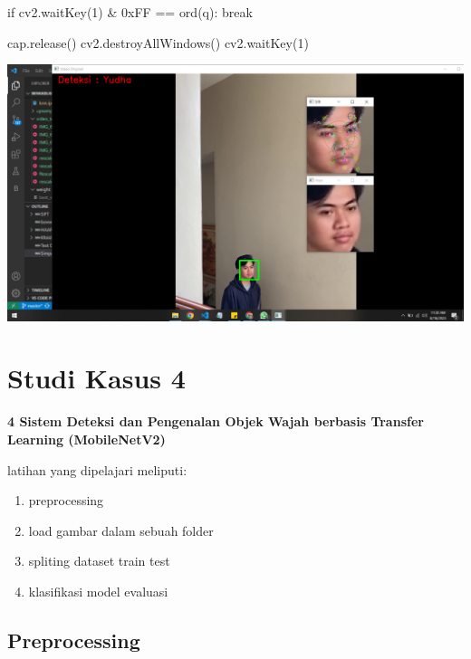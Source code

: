 \documentclass[
  letterpaper,
  DIV=11,
  numbers=noendperiod]{scrreprt}
\newenvironment{Shaded}{\begin{snugshade}}{\end{snugshade}}
\newcommand{\BaseNTok}[1]{\textcolor[rgb]{0.68,0.00,0.00}{#1}}
\newcommand{\BuiltInTok}[1]{\textcolor[rgb]{0.00,0.23,0.31}{#1}}
\newcommand{\ControlFlowTok}[1]{\textcolor[rgb]{0.00,0.23,0.31}{#1}}
\newcommand{\DecValTok}[1]{\textcolor[rgb]{0.68,0.00,0.00}{#1}}
\newcommand{\NormalTok}[1]{\textcolor[rgb]{0.00,0.23,0.31}{#1}}
\newcommand{\OperatorTok}[1]{\textcolor[rgb]{0.37,0.37,0.37}{#1}}
\newcommand{\StringTok}[1]{\textcolor[rgb]{0.13,0.47,0.30}{#1}}
\providecommand{\tightlist}{%
  \setlength{\itemsep}{0pt}\setlength{\parskip}{0pt}}\usepackage{longtable,booktabs,array}
\begin{document}
\begin{Shaded}
\begin{Highlighting}[]
    \ControlFlowTok{if}\NormalTok{ cv2.waitKey(}\DecValTok{1}\NormalTok{) }\OperatorTok{\&} \BaseNTok{0xFF} \OperatorTok{==} \BuiltInTok{ord}\NormalTok{(}\StringTok{\textquotesingle{}q\textquotesingle{}}\NormalTok{):}
        \ControlFlowTok{break}
    
\NormalTok{cap.release()}
\NormalTok{cv2.destroyAllWindows()}
\NormalTok{cv2.waitKey(}\DecValTok{1}\NormalTok{)}
\end{Highlighting}
\end{Shaded}

\includegraphics{Asset/testhaar_sift_knn_inputvideo.png}

\hypertarget{studi-kasus-4}{%
\chapter*{Studi Kasus 4}\label{studi-kasus-4}}


\textbf{4 Sistem Deteksi dan Pengenalan Objek Wajah berbasis Transfer
Learning (MobileNetV2)}

latihan yang dipelajari meliputi:

\begin{enumerate}
\def\labelenumi{\arabic{enumi}.}
\tightlist
\item
  preprocessing
\item
  load gambar dalam sebuah folder
\item
  spliting dataset train test
\item
  klasifikasi model evaluasi
\end{enumerate}

\hypertarget{preprocessing-2}{%
\section*{Preprocessing}\label{preprocessing-2}}
\end{document}
